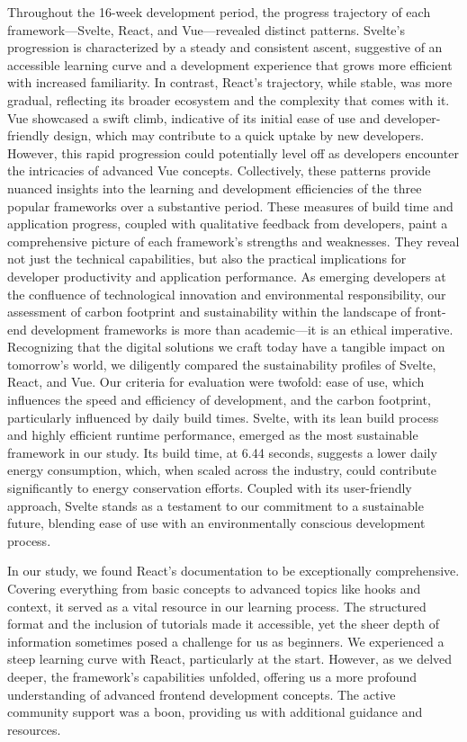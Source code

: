 Throughout the 16-week development period, the progress trajectory of each framework—Svelte, React, and Vue—revealed distinct patterns. Svelte's progression is characterized by a steady and consistent ascent, suggestive of an accessible learning curve and a development experience that grows more efficient with increased familiarity. In contrast, React's trajectory, while stable, was more gradual, reflecting its broader ecosystem and the complexity that comes with it. Vue showcased a swift climb, indicative of its initial ease of use and developer-friendly design, which may contribute to a quick uptake by new developers. However, this rapid progression could potentially level off as developers encounter the intricacies of advanced Vue concepts. Collectively, these patterns provide nuanced insights into the learning and development efficiencies of the three popular frameworks over a substantive period.
These measures of build time and application progress, coupled with qualitative feedback from developers, paint a comprehensive picture of each framework's strengths and weaknesses. They reveal not just the technical capabilities, but also the practical implications for developer productivity and application performance.
As emerging developers at the confluence of technological innovation and environmental responsibility, our assessment of carbon footprint and sustainability within the landscape of front-end development frameworks is more than academic—it is an ethical imperative. Recognizing that the digital solutions we craft today have a tangible impact on tomorrow's world, we diligently compared the sustainability profiles of Svelte, React, and Vue. Our criteria for evaluation were twofold: ease of use, which influences the speed and efficiency of development, and the carbon footprint, particularly influenced by daily build times. Svelte, with its lean build process and highly efficient runtime performance, emerged as the most sustainable framework in our study. Its build time, at 6.44 seconds, suggests a lower daily energy consumption, which, when scaled across the industry, could contribute significantly to energy conservation efforts. Coupled with its user-friendly approach, Svelte stands as a testament to our commitment to a sustainable future, blending ease of use with an environmentally conscious development process.


In our study, we found React's documentation to be exceptionally comprehensive. Covering everything from basic concepts to advanced topics like hooks and context, it served as a vital resource in our learning process. The structured format and the inclusion of tutorials made it accessible, yet the sheer depth of information sometimes posed a challenge for us as beginners. We experienced a steep learning curve with React, particularly at the start. However, as we delved deeper, the framework's capabilities unfolded, offering us a more profound understanding of advanced frontend development concepts. The active community support was a boon, providing us with additional guidance and resources.

